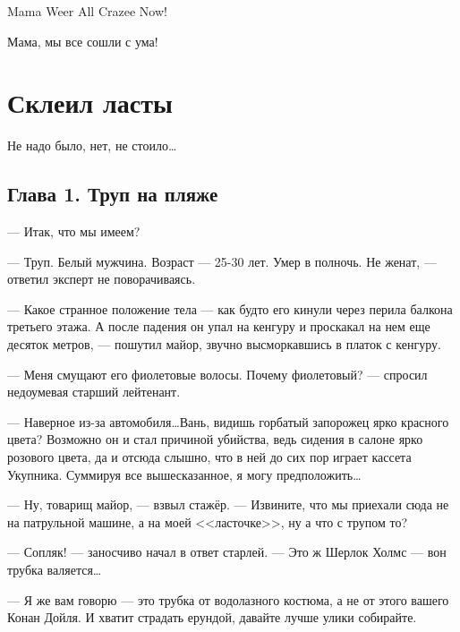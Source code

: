 \subtitle{от команды мёртвой сосны}
\begin{epigraph}
    Mama Weer All Crazee Now!
\end{epigraph}
\begin{epigraph}
    Мама, мы все сошли с ума!
\end{epigraph}

\section*{Склеил ласты}
\begin{epigraph}
Не надо было, нет, не стоило\ldots
{}
\end{epigraph}

\subsection*{Глава 1. Труп на пляже}
--- Итак, что мы имеем?

--- Труп. Белый мужчина. Возраст --- 25-30 лет. Умер в полночь. Не женат, --- ответил эксперт не поворачиваясь.

--- Какое странное положение тела --- как будто его кинули через перила балкона третьего этажа. А после падения он упал на кенгуру и проскакал на нем еще десяток метров, --- пошутил майор, звучно высморкавшись в платок с кенгуру.

--- Меня смущают его фиолетовые волосы. Почему фиолетовый? --- спросил недоумевая старший лейтенант.

--- Наверное из-за автомобиля\ldots Вань, видишь горбатый запорожец ярко красного цвета? Возможно он и стал причиной убийства, ведь сидения в салоне ярко розового цвета, да и отсюда слышно, что в ней до сих пор играет кассета Укупника. Суммируя все вышесказанное, я могу предположить\ldots

--- Ну, товарищ майор, --- взвыл стажёр. --- Извините, что мы приехали сюда не на патрульной машине, а на моей <<ласточке>>, ну а что с трупом то?

--- Сопляк! --- заносчиво начал в ответ старлей. --- Это ж Шерлок Холмс --- вон трубка валяется\ldots

--- Я же вам говорю --- это трубка от водолазного костюма, а не от этого вашего Конан Дойля. И хватит страдать ерундой, давайте лучше улики собирайте.

